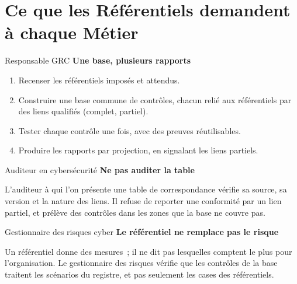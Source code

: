 \section{Ce que les Référentiels demandent à chaque Métier}
\label{sec:c09-metiers}

\begin{boxmetier}{Responsable GRC}
\textbf{Une base, plusieurs rapports}
\begin{enumerate}
    \item Recenser les référentiels imposés et attendus.
    \item Construire une base commune de contrôles, chacun relié aux
          référentiels par des liens qualifiés (complet, partiel).
    \item Tester chaque contrôle une fois, avec des preuves réutilisables.
    \item Produire les rapports par projection, en signalant les liens
          partiels.
\end{enumerate}
\end{boxmetier}

\begin{boxmetier}{Auditeur en cybersécurité}
\textbf{Ne pas auditer la table}

L'auditeur à qui l'on présente une table de correspondance vérifie sa
source, sa version et la nature des liens. Il refuse de reporter une
conformité par un lien partiel, et prélève des contrôles dans les zones
que la base ne couvre pas.
\end{boxmetier}

\begin{boxmetier}{Gestionnaire des risques cyber}
\textbf{Le référentiel ne remplace pas le risque}

Un référentiel donne des mesures~; il ne dit pas lesquelles comptent le
plus pour l'organisation. Le gestionnaire des risques vérifie que les
contrôles de la base traitent les scénarios du registre, et pas seulement
les cases des référentiels.
\end{boxmetier}

\separateur

